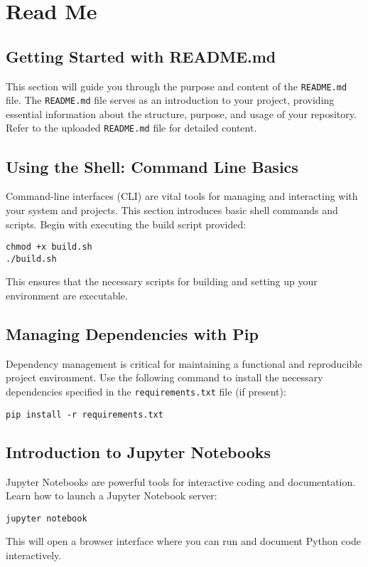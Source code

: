 \chapter{Read Me}

\section{Getting Started with README.md}
This section will guide you through the purpose and content of the \texttt{README.md} file. The \texttt{README.md} file serves as an introduction to your project, providing essential information about the structure, purpose, and usage of your repository. Refer to the uploaded \texttt{README.md} file for detailed content.

\section{Using the Shell: Command Line Basics}
Command-line interfaces (CLI) are vital tools for managing and interacting with your system and projects. This section introduces basic shell commands and scripts. Begin with executing the build script provided:
\begin{verbatim}
chmod +x build.sh
./build.sh
\end{verbatim}
This ensures that the necessary scripts for building and setting up your environment are executable.

\section{Managing Dependencies with Pip}
Dependency management is critical for maintaining a functional and reproducible project environment. Use the following command to install the necessary dependencies specified in the \texttt{requirements.txt} file (if present):
\begin{verbatim}
pip install -r requirements.txt
\end{verbatim}

\section{Introduction to Jupyter Notebooks}
Jupyter Notebooks are powerful tools for interactive coding and documentation. Learn how to launch a Jupyter Notebook server:
\begin{verbatim}
jupyter notebook
\end{verbatim}
This will open a browser interface where you can run and document Python code interactively.

